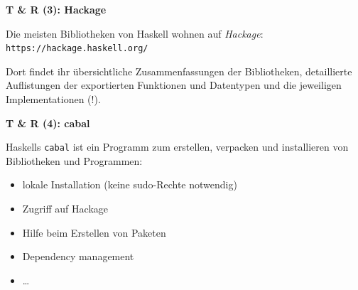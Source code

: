 \documentclass[unknownkeysallowed]{beamer}
\begin{document}
  
  \begin{frame}
    \Large\textbf{T \& R (3): Hackage}\bigskip \normalsize
    
    Die meisten Bibliotheken von Haskell wohnen auf \emph{Hackage}: \\ \bigskip \texttt{https://hackage.haskell.org/}
    
    Dort findet ihr übersichtliche Zusammenfassungen der Bibliotheken, detaillierte Auflistungen der exportierten Funktionen und Datentypen und die jeweiligen Implementationen (!).
  \end{frame}
  
  
  \begin{frame}
    \Large\textbf{T \& R (4): cabal}\bigskip \normalsize
    
    Haskells \texttt{cabal} ist ein Programm zum erstellen, verpacken und installieren
    von Bibliotheken und Programmen:
    
    \begin{itemize}
    \item lokale Installation (keine sudo-Rechte notwendig)
    \item Zugriff auf Hackage 
    \item Hilfe beim Erstellen von Paketen
    \item Dependency management
    \item \dots
    \end{itemize}
  \end{frame}
  
  
\end{document}
